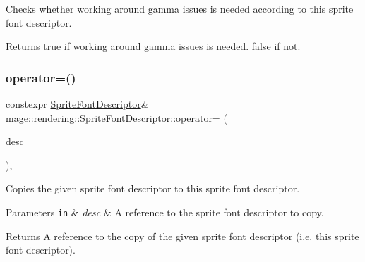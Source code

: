 Checks whether working around gamma issues is needed according to this sprite font descriptor.

\begin{DoxyReturn}{Returns}
{\ttfamily true} if working around gamma issues is needed. {\ttfamily false} if not. 
\end{DoxyReturn}
\hypertarget{classmage_1_1rendering_1_1_sprite_font_descriptor_a41d694f929b38995aca3ccb7ee79215e}{}\label{classmage_1_1rendering_1_1_sprite_font_descriptor_a41d694f929b38995aca3ccb7ee79215e} 
\subsubsection{\texorpdfstring{operator=()}{operator=()}\hspace{0.1cm}{\footnotesize\ttfamily [1/2]}}
{\footnotesize\ttfamily constexpr \hyperlink{classmage_1_1rendering_1_1_sprite_font_descriptor}{Sprite\+Font\+Descriptor}\& mage\+::rendering\+::\+Sprite\+Font\+Descriptor\+::operator= (\begin{DoxyParamCaption}\item[{const \hyperlink{classmage_1_1rendering_1_1_sprite_font_descriptor}{Sprite\+Font\+Descriptor} \&}]{desc }\end{DoxyParamCaption})\hspace{0.3cm}{\ttfamily [default]}, {\ttfamily [noexcept]}}

Copies the given sprite font descriptor to this sprite font descriptor.


\begin{DoxyParams}[1]{Parameters}
\mbox{\tt in}  & {\em desc} & A reference to the sprite font descriptor to copy. \\
\hline
\end{DoxyParams}
\begin{DoxyReturn}{Returns}
A reference to the copy of the given sprite font descriptor (i.\+e. this sprite font descriptor). 
\end{DoxyReturn}
\hypertarget{classmage_1_1rendering_1_1_sprite_font_descriptor_a40479c5c747c6cbcb5fdf09e6027d650}{}\label{classmage_1_1rendering_1_1_sprite_font_descriptor_a40479c5c747c6cbcb5fdf09e6027d650} 
